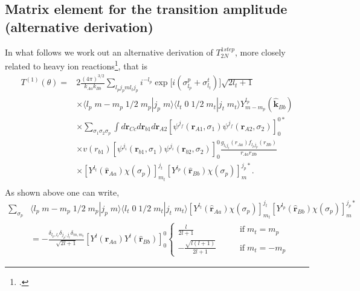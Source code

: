 \subsection{Matrix element for the transition amplitude (alternative derivation)}
In what follows we work out an alternative derivation of $T^{1step}_{2N}$, more closely related to heavy ion reactions\footnote{\cite{Bayman:82}.}, that is
\begin{equation}\label{eq141}
 \begin{split}
T^{(1)}(\theta)=&2\frac{(4\pi)^{3/2}}{k_{Aa}k_{Bb}}\sum_{l_pj_pml_tj_p}i^{-l_p}
\exp\bigl[i(\sigma_{l_p}^p+\sigma_{l_t}^t)\bigr] \sqrt{2l_t+1}\\
&\times \langle l_p \;m-m_p\;1/2\;m_p|j_p\;m\rangle\langle l_t \;0\;1/2\;m_t|j_t\;m_t\rangle Y_{m-m_p}^{l_p}(\hat{\mathbf{k}}_{Bb})\\
 &\times \sum_{\sigma_1 \sigma_2 \sigma_p}\int d\mathbf{r}_{Cc}d\mathbf{r}_{b1}d\mathbf{r}_{A2}\left[ \psi ^{j_f} (\mathbf{r}_{A1},\sigma_1) \psi ^{j_f} (\mathbf{r}_{A2},\sigma_2) \right] _0^{0*}\\
 &\times  v(r_{b1})
\left[ \psi ^{j_i} (\mathbf{r}_{b1},\sigma_1) \psi ^{j_i} (\mathbf{r}_{b2},\sigma_2) \right] _0^{0} \frac{g_{l_tj_t}(r_{Aa})f_{l_pj_p}(r_{Bb})}{r_{Aa}r_{Bb}}\\
 &\times \left[Y^{l_t}(\hat{\mathbf{r}}_{Aa})\chi(\sigma_p)\right]^{j_t}_{m_t}\left[Y^{l_p}
    (\hat{\mathbf{r}}_{Bb})\chi(\sigma_p)\right]^{j_p*}_{m}.\\
 \end{split}
\end{equation}
As shown above one can write,
\begin{equation}\label{eq142}
 \begin{split}
\sum_{\sigma_p}& \langle l_p \;m-m_p\;1/2\;m_p|j_p\;m\rangle\langle l_t \;0\;1/2\;m_t|j_t\;m_t\rangle \left[Y^{l_t}(\hat{\mathbf{r}}_{Aa})\chi(\sigma_p)\right]^{j_t}_{m_t}\left[Y^{l_p}
    (\hat{\mathbf{r}}_{Bb})\chi(\sigma_p)\right]^{j_p*}_{m}\\
    &=-\frac{\delta_{l_p,l_t}\delta_{j_p,j_t}\delta_{m,m_t}}{\sqrt{2l+1}}
    \left[Y^{l}(\hat{\mathbf{r}}_{Aa})Y^{l}(\hat{\mathbf{r}}_{Bb})\right]^{0}_{0}
    \left\{
\begin{aligned}
\frac{l}{2l+1} \qquad &\text{if}\; m_t=m_p\\
-\frac{\sqrt{l(l+1)}}{2l+1}\qquad &\text{if} \;m_t=-m_p
\end{aligned}
\right.
 \end{split}
\end{equation}
